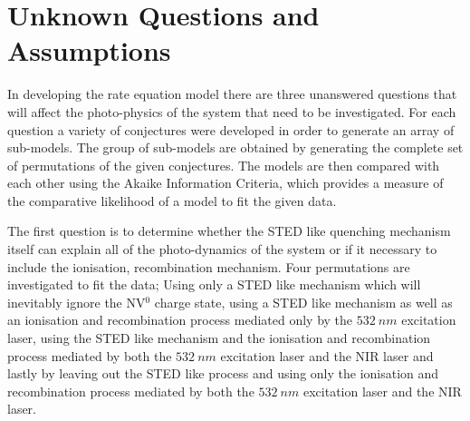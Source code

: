 \documentclass[preprint,prl]{revtex4}
\begin{document}
\section{Unknown Questions and Assumptions }
In developing the rate equation model there are three unanswered questions that will affect the photo-physics of the system that need to be investigated. For each question a variety of conjectures were developed in order to generate an array of sub-models. The group of sub-models are obtained by generating the complete set of permutations of the given conjectures. The models are then compared with each other using the Akaike Information Criteria, which provides a measure of the comparative likelihood of a model to fit the given data.

The first question is to determine whether the STED like quenching mechanism itself can explain all of the photo-dynamics of the system or if it necessary to include the ionisation, recombination mechanism. Four permutations are investigated to fit the data; Using only a STED like mechanism which will inevitably ignore the NV$^0$ charge state, using a STED like mechanism as well as an ionisation and recombination process mediated only by the $\SI{532}{nm}$ excitation laser, using the STED like mechanism and the ionisation and recombination process mediated by both the $\SI{532}{nm}$ excitation laser and the NIR laser and lastly by leaving out the STED like process and using only the ionisation and recombination process mediated by both the $\SI{532}{nm}$ excitation laser and the NIR laser.
\end{document}
